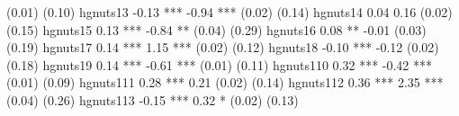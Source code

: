                                                                                             (0.01)         (0.10)   
hgnuts13                                                                                    -0.13 ***      -0.94 ***
                                                                                            (0.02)         (0.14)   
hgnuts14                                                                                     0.04           0.16    
                                                                                            (0.02)         (0.15)   
hgnuts15                                                                                     0.13 ***      -0.84 ** 
                                                                                            (0.04)         (0.29)   
hgnuts16                                                                                     0.08 **       -0.01    
                                                                                            (0.03)         (0.19)   
hgnuts17                                                                                     0.14 ***       1.15 ***
                                                                                            (0.02)         (0.12)   
hgnuts18                                                                                    -0.10 ***      -0.12    
                                                                                            (0.02)         (0.18)   
hgnuts19                                                                                     0.14 ***      -0.61 ***
                                                                                            (0.01)         (0.11)   
hgnuts110                                                                                    0.32 ***      -0.42 ***
                                                                                            (0.01)         (0.09)   
hgnuts111                                                                                    0.28 ***       0.21    
                                                                                            (0.02)         (0.14)   
hgnuts112                                                                                    0.36 ***       2.35 ***
                                                                                            (0.04)         (0.26)   
hgnuts113                                                                                   -0.15 ***       0.32 *  
                                                                                            (0.02)         (0.13)   
